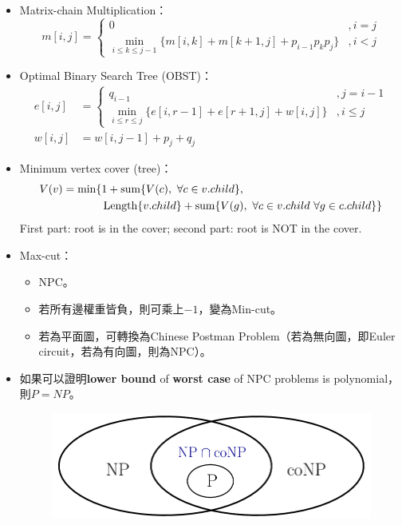 \begin{itemize}
    \item Matrix-chain Multiplication：\begin{equation}
        m[i, j] = \begin{cases}
            0 &, i = j \\
            \min_{i \le k \le j - 1}\{m[i, k] + m[k + 1, j] + p_{i - 1}p_kp_j\} &, i < j
        \end{cases}
    \end{equation} 
    \item Optimal Binary Search Tree (OBST)：\begin{equation}
        \begin{aligned}
            e[i, j] & = \begin{cases}
                q_{i - 1} &, j = i - 1 \\
                \min_{i \le r \le j}\{e[i, r - 1] + e[r + 1, j] + w[i, j]\} &, i \le j
            \end{cases} \\
            w[i, j] & = w[i, j - 1] + p_j + q_j
        \end{aligned}
    \end{equation}
    \item Minimum vertex cover (tree)：\begin{equation}
        \begin{aligned}
            V(v) = \min \{& 1 + \operatorname{sum}\{V(c), \ \forall c \in v.child\}, \\
            & \operatorname{Length}\{v.child\} + \operatorname{sum}\{V(g), \ \forall c \in v.child \ \forall g \in c.child\}
        \}   
        \end{aligned}
    \end{equation} First part: root is in the cover; second part: root is NOT in the cover.
    \item Max-cut： \begin{itemize}
        \item NPC。
        \item 若所有邊權重皆負，則可乘上$-1$，變為Min-cut。
        \item 若為平面圖，可轉換為Chinese Postman Problem（若為無向圖，即Euler circuit，若為有向圖，則為NPC）。
    \end{itemize}
    \item 如果可以證明\textbf{lower bound} of \textbf{worst case} of NPC problems is polynomial，則$P=NP$。
    \begin{figure}[H]
        \centering
        \includegraphics[scale=0.4]{img/np-conp.png}

\end{figure}
\end{itemize}
